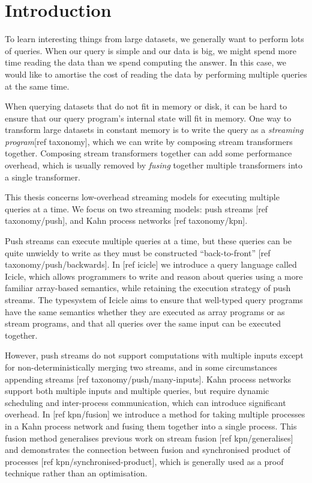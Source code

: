 \chapter{Introduction}
\label{introduction}
To learn interesting things from large datasets, we generally want to perform lots of queries.
When our query is simple and our data is big, we might spend more time reading the data than we spend computing the answer.
In this case, we would like to amortise the cost of reading the data by performing multiple queries at the same time.

When querying datasets that do not fit in memory or disk, it can be hard to ensure that our query program's internal state will fit in memory.
One way to transform large datasets in constant memory is to write the query as a \emph{streaming program}[ref taxonomy], which we can write by composing stream transformers together.
Composing stream transformers together can add some performance overhead, which is usually removed by \emph{fusing} together multiple transformers into a single transformer.


This thesis concerns low-overhead streaming models for executing multiple queries at a time.
We focus on two streaming models: push streams [ref taxonomy/push], and Kahn process networks [ref taxonomy/kpn].

Push streams can execute multiple queries at a time, but these queries can be quite unwieldy to write as they must be constructed ``back-to-front'' [ref taxonomy/push/backwards].
In [ref icicle] we introduce a query language called Icicle, which allows programmers to write and reason about queries using a more familiar array-based semantics, while retaining the execution strategy of push streams.
The typesystem of Icicle aims to ensure that well-typed query programs have the same semantics whether they are executed as array programs or as stream programs, and that all queries over the same input can be executed together.

However, push streams do not support computations with multiple inputs except for non-deterministically merging two streams, and in some circumstances appending streams [ref taxonomy/push/many-inputs].
Kahn process networks support both multiple inputs and multiple queries, but require dynamic scheduling and inter-process communication, which can introduce significant overhead.
In [ref kpn/fusion] we introduce a method for taking multiple processes in a Kahn process network and fusing them together into a single process.
This fusion method generalises previous work on stream fusion [ref kpn/generalises] and demonstrates the connection between fusion and synchronised product of processes [ref kpn/synchronised-product], which is generally used as a proof technique rather than an optimisation.

